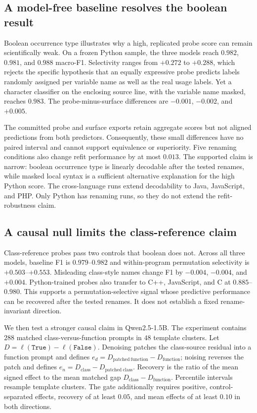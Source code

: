 \documentclass{article}
\begin{document}
\subsection{A model-free baseline resolves the boolean result}

Boolean occurrence type illustrates why a high, replicated probe score can
remain scientifically weak. On a frozen Python sample, the three models reach
$0.982$, $0.981$, and $0.988$ macro-F1. Selectivity ranges from $+0.272$ to
$+0.288$, which rejects the specific hypothesis that an equally expressive
probe predicts labels randomly assigned per variable name as well as the real
usage labels. Yet a character classifier on
the enclosing source line, with the variable name masked, reaches $0.983$.
The probe-minus-surface differences are $-0.001$, $-0.002$, and $+0.005$.

The committed probe and surface exports retain aggregate scores but not aligned
predictions from both predictors. Consequently, these small differences have
no paired interval and cannot support equivalence or superiority. Five
renaming conditions also change refit performance by at most $0.013$. The
supported claim is narrow: boolean occurrence type is linearly decodable after
the tested renames, while masked local syntax is a sufficient alternative
explanation for the high Python score. The cross-language runs extend
decodability to Java, JavaScript, and PHP. Only Python has renaming runs, so
they do not extend the refit-robustness claim.

\subsection{A causal null limits the class-reference claim}

Class-reference probes pass two controls that boolean does not. Across all
three models, baseline F1 is $0.979$--$0.982$ and within-program permutation
selectivity is
$+0.503$--$+0.553$. Misleading class-style names change F1 by
$-0.004$, $-0.004$, and $+0.004$. Python-trained probes also transfer to C++,
JavaScript, and C at $0.885$--$0.980$. This supports a
permutation-selective signal whose predictive performance can be recovered
after the tested renames. It does not establish a fixed rename-invariant
direction.

We then test a stronger causal claim in Qwen2.5-1.5B. The experiment contains
$288$ matched class-versus-function prompts in $48$ template clusters. Let
$D=\ell(\texttt{True})-\ell(\texttt{False})$. Denoising patches the
class-source residual into a function prompt and defines
$e_d=D_{\mathrm{patched\ function}}-D_{\mathrm{function}}$; noising reverses
the patch and defines
$e_n=D_{\mathrm{class}}-D_{\mathrm{patched\ class}}$. Recovery is the ratio of
the mean signed effect to the mean matched gap
$D_{\mathrm{class}}-D_{\mathrm{function}}$. Percentile intervals resample
template clusters. The gate additionally requires positive, control-separated
effects, recovery of at least $0.05$, and mean effects of at least $0.10$ in
both directions.
\end{document}

